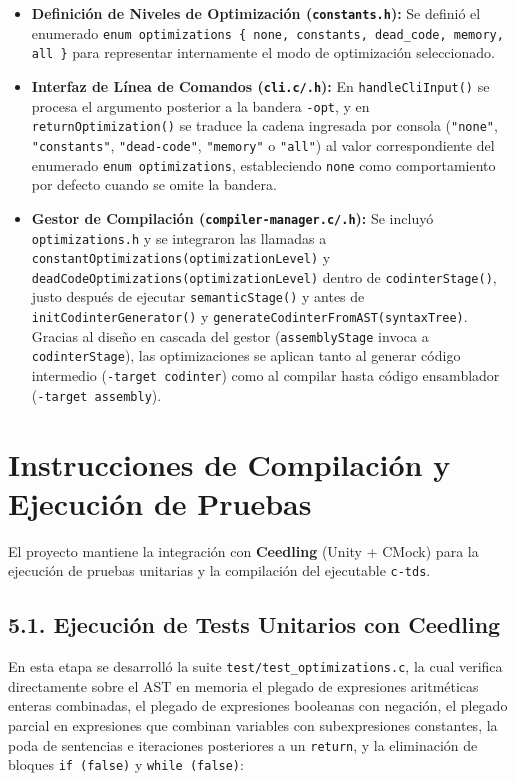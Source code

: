 \documentclass[12pt, a4paper]{article}
\begin{document}
\begin{itemize}
    \item \textbf{Definición de Niveles de Optimización (\texttt{constants.h}):} Se definió el enumerado \texttt{enum optimizations \{ none, constants, dead\_code, memory, all \}} para representar internamente el modo de optimización seleccionado.
    \item \textbf{Interfaz de Línea de Comandos (\texttt{cli.c/.h}):} En \texttt{handleCliInput()} se procesa el argumento posterior a la bandera \texttt{-opt}, y en \texttt{returnOptimization()} se traduce la cadena ingresada por consola (\texttt{"none"}, \texttt{"constants"}, \texttt{"dead-code"}, \texttt{"memory"} o \texttt{"all"}) al valor correspondiente del enumerado \texttt{enum optimizations}, estableciendo \texttt{none} como comportamiento por defecto cuando se omite la bandera.
    \item \textbf{Gestor de Compilación (\texttt{compiler-manager.c/.h}):} Se incluyó \texttt{optimizations.h} y se integraron las llamadas a \texttt{constantOptimizations(\allowbreak optimizationLevel)} y \texttt{deadCodeOptimizations(\allowbreak optimizationLevel)} dentro de \texttt{codinterStage()}, justo después de ejecutar \texttt{semanticStage()} y antes de \texttt{initCodinterGenerator()} y \texttt{generateCodinterFromAST(\allowbreak syntaxTree)}. Gracias al diseño en cascada del gestor (\texttt{assemblyStage} invoca a \texttt{codinterStage}), las optimizaciones se aplican tanto al generar código intermedio (\texttt{-target codinter}) como al compilar hasta código ensamblador (\texttt{-target assembly}).
\end{itemize}

\section{Instrucciones de Compilación y Ejecución de Pruebas}
El proyecto mantiene la integración con \textbf{Ceedling} (Unity + CMock) para la ejecución de pruebas unitarias y la compilación del ejecutable \texttt{c-tds}.

\subsection*{5.1. Ejecución de Tests Unitarios con Ceedling}
En esta etapa se desarrolló la suite \texttt{test/test\_optimizations.c}, la cual verifica directamente sobre el AST en memoria el plegado de expresiones aritméticas enteras combinadas, el plegado de expresiones booleanas con negación, el plegado parcial en expresiones que combinan variables con subexpresiones constantes, la poda de sentencias e iteraciones posteriores a un \texttt{return}, y la eliminación de bloques \texttt{if (false)} y \texttt{while (false)}:
\end{document}
